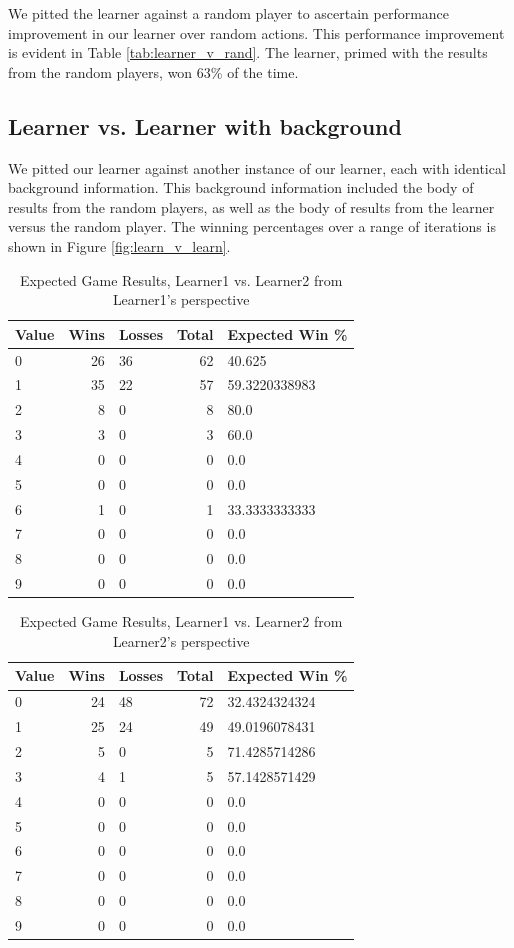 \documentclass[12pt,pdftex]{article}
\begin{document}
We pitted the learner against a random player to ascertain performance improvement in our learner over random actions. 
This performance improvement is evident in Table \ref{tab:learner_v_rand}. The learner, primed with the results from the random players, won 63\% of the time.  %

\subsection{Learner vs. Learner with background}
We pitted our learner against another instance of our learner, each with identical background information.
This background information included the body of results from the random players, as well as the body of results from the learner versus the random player. 
The winning percentages over a range of iterations is shown in Figure \ref{fig:learn_v_learn}.
\begin{table}[hb!]
\centering
\begin{tabular}{| l | r | l | r | l |}
	\hline
 \textbf{Value} & \textbf{Wins}& \textbf{Losses}& \textbf{Total}& \textbf{Expected Win \%}\\
\hline
0& 26& 36& 62& 40.625\\
1& 35& 22& 57& 59.3220338983\\
2& 8& 0& 8& 80.0\\
3& 3& 0& 3& 60.0\\
4& 0& 0& 0& 0.0\\
5& 0& 0& 0& 0.0\\
6& 1& 0& 1& 33.3333333333\\
7& 0& 0& 0& 0.0\\
8& 0& 0& 0& 0.0\\
9& 0& 0& 0& 0.0\\
\hline
\end{tabular}
\caption{Expected Game Results, Learner1 vs. Learner2 from Learner1's perspective}
\label{tab:learner1_v_learner}
\end{table}

\begin{table}[hb!]
\centering
\begin{tabular}{| l | r | l | r | l |}
	\hline
 \textbf{Value} & \textbf{Wins}& \textbf{Losses}& \textbf{Total}& \textbf{Expected Win \%}\\
\hline
0& 24& 48& 72& 32.4324324324\\
1& 25& 24& 49& 49.0196078431\\
2& 5& 0& 5& 71.4285714286\\
3& 4& 1& 5& 57.1428571429\\
4& 0& 0& 0& 0.0\\
5& 0& 0& 0& 0.0\\
6& 0& 0& 0& 0.0\\
7& 0& 0& 0& 0.0\\
8& 0& 0& 0& 0.0\\
9& 0& 0& 0& 0.0\\
\hline
\end{tabular}
\caption{Expected Game Results, Learner1 vs. Learner2 from Learner2's perspective}
\label{tab:learner2_v_learner}
\end{table}
\end{document}
